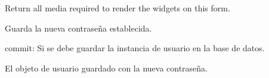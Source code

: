 \documentclass[letterpaper,10pt,spanish]{sphinxmanual}
\begin{document}
\begin{fulllineitems}
\begin{fulllineitems}

\pysigstartsignatures
{}
\pysigstopsignatures
\end{fulllineitems}



\begin{fulllineitems}

\pysigstartsignatures
{}
\pysigstopsignatures
\sphinxAtStartPar
Return all media required to render the widgets on this form.

\end{fulllineitems}



\begin{fulllineitems}

\pysigstartsignatures
{}
\pysigstopsignatures
\sphinxAtStartPar
Guarda la nueva contraseña establecida.
\begin{description}
\sphinxAtStartPar
commit: Si se debe guardar la instancia de usuario en la base de datos.

\sphinxAtStartPar
El objeto de usuario guardado con la nueva contraseña.

\end{description}

\end{fulllineitems}


\end{fulllineitems}
\end{document}
